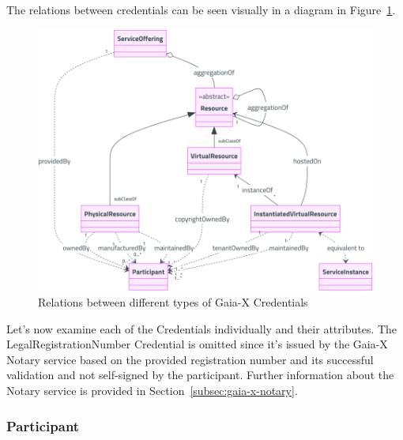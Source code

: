 The relations between credentials can be seen visually in a diagram in Figure~\ref{fig:credential_relations}.

\begin{figure}
    \centering
    \includegraphics[width=\textwidth]{figures/credential-relations.png}
    \caption{Relations between different types of Gaia-X Credentials~\cite{gaiax_architecture_document}}\label{fig:credential_relations}
\end{figure}

Let's now examine each of the Credentials individually and their attributes.
The LegalRegistrationNumber Credential is omitted since it's issued by the Gaia-X Notary service based on the provided registration number and its successful validation and not self-signed by the participant.
Further information about the Notary service is provided in Section~\ref{subsec:gaia-x-notary}.

\subsubsection{Participant}

